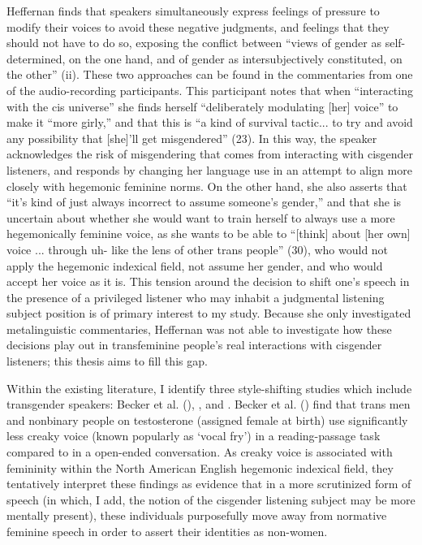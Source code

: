 \documentclass[12pt,twoside]{reedthesis}
\begin{document}
Heffernan finds that speakers simultaneously express feelings of pressure to modify their voices to avoid these negative judgments, and feelings that they should not have to do so, exposing the conflict between ``views of gender as self-determined, on the one  hand, and of gender as intersubjectively constituted, on the other'' (ii). These two approaches can be found in the commentaries from one of the audio-recording participants. This participant notes that when ``interacting with the cis universe'' she finds herself ``deliberately modulating [her] voice'' to make it ``more girly,'' and that this is ``a kind of survival tactic... to try and avoid any possibility that [she]'ll get misgendered'' (23). In this way, the speaker acknowledges the risk of misgendering that comes from interacting with cisgender listeners, and responds by changing her language use in an attempt to align more closely with hegemonic feminine norms. On the other hand, she also asserts that ``it's kind of just always incorrect to assume someone's gender,'' and that she is uncertain about whether she would want to train herself to always use a more hegemonically feminine voice, as she wants to be able to ``[think] about [her own] voice ... through uh- like the lens of other trans people'' (30), who would not apply the hegemonic indexical field, not assume her gender, and who would accept her voice as it is. This tension around the decision to shift one's speech in the presence of a privileged listener who may inhabit a judgmental listening subject position is of primary interest to my study. Because she only investigated metalinguistic commentaries, Heffernan was not able to investigate how these decisions play out in transfeminine people's real interactions with cisgender listeners; this thesis aims to fill this gap.
	
Within the existing literature, I identify three style-shifting studies which include transgender speakers: Becker et al. (\cite*{becker_beyond_2022}), \textcite{gratton_resisting_2016}, and \textcite{parnell-mooney_transgender_2019}. Becker et al. (\cite*{becker_beyond_2022}) find that trans men and nonbinary people on testosterone (assigned female at birth) use significantly less creaky voice (known popularly as `vocal fry') in a reading-passage task compared to in a open-ended conversation. As creaky voice is associated with femininity within the North American English hegemonic indexical field, they tentatively interpret these findings as evidence that in a more scrutinized form of speech (in which, I add, the notion of the cisgender listening subject may be more mentally present), these individuals purposefully move away from normative feminine speech in order to assert their identities as non-women.
	
\end{document}
